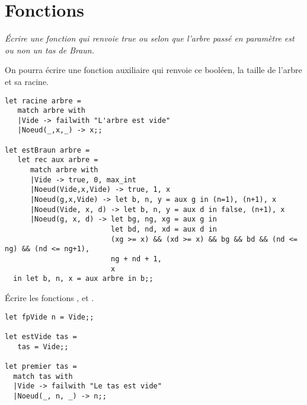 \section{Fonctions}
\begin{Exercise}[title = Test]\it 
Écrire une fonction  qui renvoie true ou  selon que l'arbre passé en paramètre est ou non un tas de Braun.

On pourra écrire une fonction auxiliaire qui renvoie ce booléen, la taille de l'arbre et sa racine.
\end{Exercise}
\begin{Answer}
\begin{lstlisting}
let racine arbre = 
   match arbre with
   |Vide -> failwith "L'arbre est vide"
   |Noeud(_,x,_) -> x;;
  
let estBraun arbre = 
   let rec aux arbre =
      match arbre with
      |Vide -> true, 0, max_int
      |Noeud(Vide,x,Vide) -> true, 1, x
      |Noeud(g,x,Vide) -> let b, n, y = aux g in (n=1), (n+1), x
      |Noeud(Vide, x, d) -> let b, n, y = aux d in false, (n+1), x
      |Noeud(g, x, d) -> let bg, ng, xg = aux g in
                         let bd, nd, xd = aux d in
                         (xg >= x) && (xd >= x) && bg && bd && (nd <= ng) && (nd <= ng+1), 
                         ng + nd + 1, 
                         x
  in let b, n, x = aux arbre in b;;
\end{lstlisting}
\end{Answer}
\begin{Exercise}[title = Premières fonctions]\it 

Écrire les fonctions ,  et .
\end{Exercise}
\begin{Answer}
\begin{lstlisting}
let fpVide n = Vide;;

let estVide tas = 
   tas = Vide;;

let premier tas =
  match tas with
  |Vide -> failwith "Le tas est vide"
  |Noeud(_, n, _) -> n;;
\end{lstlisting}
\end{Answer}
